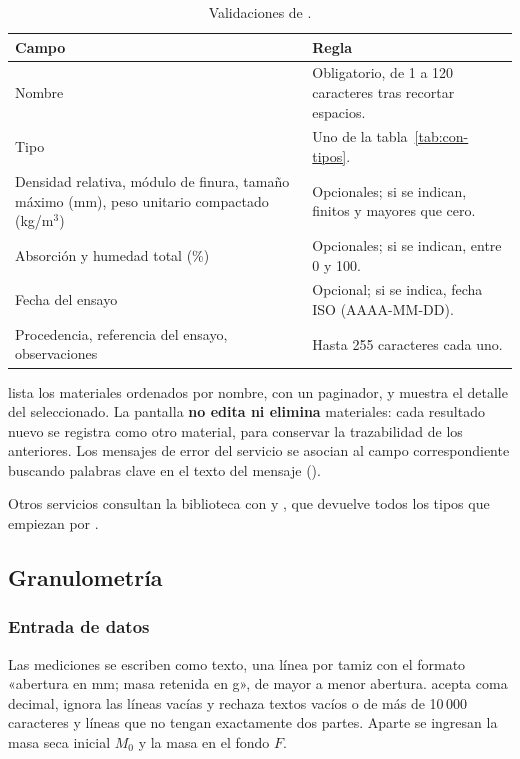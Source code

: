 \begin{table}[H]
	\centering
	\caption{Validaciones de .}
	\label{tab:con-material-validacion}
	\begin{tabular}{L{5.4cm}L{8.2cm}}
		\hline
		\textbf{Campo} & \textbf{Regla} \\ \hline
		Nombre & Obligatorio, de 1 a 120 caracteres tras recortar espacios. \\
		Tipo & Uno de la tabla~\ref{tab:con-tipos}. \\
		Densidad relativa, módulo de finura, tamaño máximo (mm), peso unitario compactado (kg/m$^3$) & Opcionales; si se
		indican, finitos y mayores que cero. \\
		Absorción y humedad total (\%) & Opcionales; si se indican, entre 0 y 100. \\
		Fecha del ensayo & Opcional; si se indica, fecha ISO (AAAA-MM-DD). \\
		Procedencia, referencia del ensayo, observaciones & Hasta 255 caracteres cada uno. \\
		\hline
	\end{tabular}
\end{table}

 lista los materiales ordenados por nombre, con un paginador, y muestra el detalle del
seleccionado. La pantalla \textbf{no edita ni elimina} materiales: cada resultado nuevo se registra como otro material,
para conservar la trazabilidad de los anteriores. Los mensajes de error del servicio se asocian al campo
correspondiente buscando palabras clave en el texto del mensaje ().

Otros servicios consultan la biblioteca con  y , que devuelve
todos los tipos que empiezan por .

\subsection{Granulometría}
\label{sec:con-granulometria}

\subsubsection{Entrada de datos}

Las mediciones se escriben como texto, una línea por tamiz con el formato «abertura en mm; masa retenida en g», de
mayor a menor abertura.  acepta coma decimal, ignora las
líneas vacías y rechaza textos vacíos o de más de 10\,000 caracteres y líneas que no tengan exactamente dos partes.
Aparte se ingresan la masa seca inicial $M_0$ y la masa en el fondo $F$.

